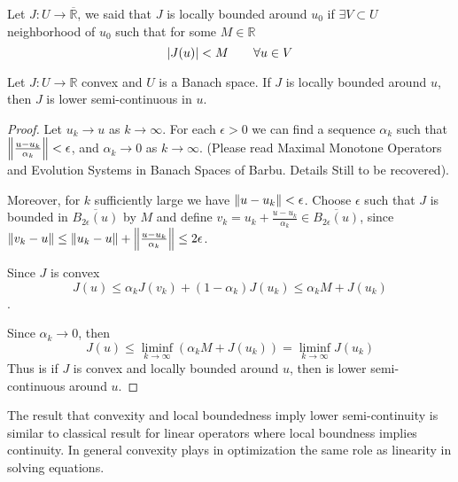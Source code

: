 \begin{definition}
	Let $J:U\rightarrow \overline{\mathbb{R}}$, we said that $J$ is locally bounded around $u_0$ if $\exists V\subset U$ neighborhood of $u_0$ such that for some $M \in \mathbb{R}$
	\[
		\left|J(u)\right| < M \qquad \forall u \in V
	\]
\end{definition}
\begin{lemma}
	Let $J:U\rightarrow \mathbb{R}$ convex and $U$ is a Banach space. If $J$ is locally bounded around $u$, then $J$ is lower semi-continuous in $u$.
	\begin{proof}
		Let $u_k \rightarrow u$ as $k\rightarrow\infty$. For each $\epsilon > 0$ we can find a sequence $\alpha_k$ such that $\left\lVert\frac{u-u_k}{\alpha_k}\right\rVert< \epsilon$, and $\alpha_k \rightarrow 0$ as $k\rightarrow \infty$. (Please read Maximal Monotone Operators and Evolution Systems
		in Banach Spaces of Barbu. Details Still to be recovered).
		
		Moreover, for $k$ sufficiently large we have $\left\lVert u-u_k\right\rVert<\epsilon$. Choose $\epsilon$ such that $J$ is bounded in $\overline{B_{2\epsilon}(u)}$ by $M$ and define $v_k = u_k + \frac{u-u_k}{\alpha_k} \in \overline{B_{2\epsilon}(u)}$, since  $\left\lVert v_k-u\right\rVert\leq \left\lVert u_k-u\right\rVert+\left\lVert\frac{u-u_k}{\alpha_k}\right\rVert\leq 2\epsilon$. 
		
		Since $J$ is convex \[J(u)\leq \alpha_k J(v_k) + (1-\alpha_k)J(u_k) \leq \alpha_k M+J(u_k)\].
		
		Since $\alpha_k \rightarrow 0$, then
		\[J(u)\leq \liminf_{k\rightarrow \infty}(\alpha_kM+J(u_k)) = \liminf_{k\rightarrow\infty} J(u_k) \]
		Thus is if $J$ is convex and locally bounded around $u$, then is lower semi-continuous around $u$.
	\end{proof}
\end{lemma}
\begin{remark}
	The result that convexity and local boundedness imply lower semi-continuity is similar to classical result for linear operators where local boundness implies continuity. In general convexity plays in optimization the same role as linearity in solving equations.
\end{remark}